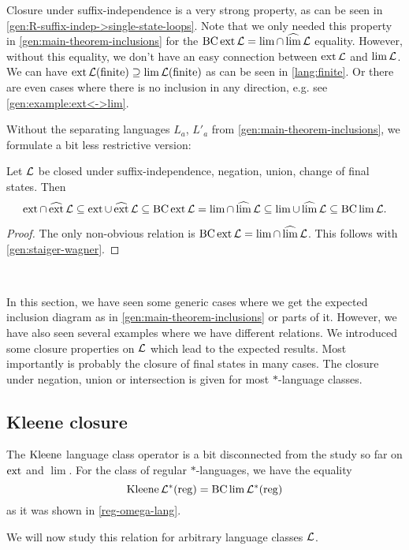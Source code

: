 Closure under suffix-independence is a very strong property, as can be seen in \cref{gen:R-suffix-indep->single-state-loops}. Note that we only needed this property in \cref{gen:main-theorem-inclusions} for the $\operatorname{BC} \operatorname{ext} \mathcal{L} = \lim \cap \operatorname{\widehat{lim}} \mathcal{L}$ equality. However, without this equality, we don't have an easy connection between $\operatorname{ext} \mathcal{L}$ and $\lim \mathcal{L}$. We can have $\operatorname{ext} \mathcal{L}(\textup{\textrm{finite}}) \supseteq \lim \mathcal{L}(\textup{\textrm{finite}})$ as can be seen in \cref{lang:finite}. Or there are even cases where there is no inclusion in any direction, e.g. see \cref{gen:example:ext<->lim}.

Without the separating languages $L_a$, $L'_a$ from \cref{gen:main-theorem-inclusions}, we formulate a bit less restrictive version:
\begin{lemma}
Let $\mathcal{L}$ be closed under suffix-independence, negation, union, change of final states. Then
\[ \operatorname{ext} \cap \operatorname{\widehat{ext}} \mathcal{L} \subseteq
\operatorname{ext} \cup \operatorname{\widehat{ext}} \mathcal{L} \subseteq
\operatorname{BC} \operatorname{ext} \mathcal{L} =
\lim \cap \operatorname{\widehat{lim}} \mathcal{L} \subseteq
\lim \cup \operatorname{\widehat{lim}} \mathcal{L} \subseteq
\operatorname{BC} \lim \mathcal{L} . \]
\begin{proof}
The only non-obvious relation is $\operatorname{BC} \operatorname{ext} \mathcal{L} = \lim \cap \operatorname{\widehat{lim}} \mathcal{L}$. This follows with \cref{gen:staiger-wagner}.
\end{proof}
\end{lemma}


\

In this section, we have seen some generic cases where we get the expected inclusion diagram as in \cref{gen:main-theorem-inclusions} or parts of it. However, we have also seen several examples where we have different relations. We introduced some closure properties on $\mathcal{L}$ which lead to the expected results. Most importantly is probably the closure of final states in many cases. The closure under negation, union or intersection is given for most $*$-language classes.


\subsection{Kleene closure}
\label{gen:section:kleene}

The $\operatorname{Kleene}$ language class operator is a bit disconnected from the study so far on $\operatorname{ext}$ and $\lim$. For the class of regular $*$-languages, we have the equality
\[ \operatorname{Kleene} \mathcal{L}^*(\textup{\textrm{reg}}) = \operatorname{BC} \lim \mathcal{L}^*(\textup{\textrm{reg}}) \]
as it was shown in \cref{reg-omega-lang}.

We will now study this relation for arbitrary language classes $\mathcal{L}$.

